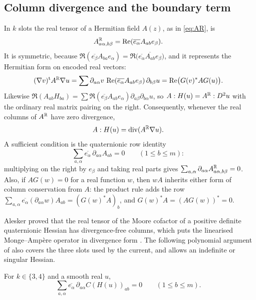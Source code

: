 \subsection{Column divergence and the boundary term}\label{ssec:divergence}
In $k$ slots the real tensor of a Hermitian field $A(z)$, as in \eqref{eq:AR}, is
\begin{equation}\label{eq:ARk}
A^{\mathbb{R}}_{a\alpha,b\beta}=\operatorname{Re}(\overline{e_\alpha}A_{ab}e_\beta) .
\end{equation}
It is symmetric, because $\Re(\overline{e_\beta}A_{ba}e_\alpha)=\Re\bigl(\overline{\overline{e_\alpha}A_{ab}e_\beta}\bigr)$,
and it represents the Hermitian form on encoded real vectors:
\[
(\nabla v)^{\rm t}A^{\mathbb{R}}\nabla u=\sum\partial_{a\alpha}v\,\operatorname{Re}(\overline{e_\alpha}A_{ab}e_\beta)\,\partial_{b\beta}u
=\operatorname{Re}\bigl(G(v)^*AG(u)\bigr).
\]
Likewise $\Re(A_{ab}H_{ba})=\sum\Re(\overline{e_\beta}A_{ab}e_\alpha)\partial_{a\beta}\partial_{b\alpha}u$,
so $A:H(u)=A^{\mathbb{R}}:D^2u$ with the ordinary real matrix pairing on the right. Consequently,
whenever the real columns of $A^{\mathbb{R}}$ have zero divergence,
\begin{equation}\label{eq:divform}
A:H(u)=\operatorname{div}(A^{\mathbb{R}}\nabla u) .
\end{equation}
A sufficient condition is the quaternionic row identity
\begin{equation}\label{eq:rowid}
\sum_{a,\alpha}\overline{e_\alpha}\,\partial_{a\alpha}A_{ab}=0\qquad(1\le b\le m):
\end{equation}
multiplying on the right by $e_\beta$ and taking real parts gives
$\sum_{a,\alpha}\partial_{a\alpha}A^{\mathbb{R}}_{a\alpha,b\beta}=0$. Also, if $AG(w)=0$ for a real
function $w$, then $wA$ inherits either form of column conservation from $A$: the product rule
adds the row $\sum_{a,\alpha}\overline{e_\alpha}(\partial_{a\alpha}w)A_{ab}=(G(w)^*A)_b$, and
$G(w)^*A=(AG(w))^*=0$.

Alesker proved that the real tensor of the Moore cofactor of a positive definite quaternionic
Hessian has divergence-free columns, which puts the linearised Monge--Amp\`ere operator in
divergence form \cite[Lemma 4.6]{Ale13}. The following polynomial argument of \cite{OAI26} also
covers the three slots used by the current, and allows an indefinite or singular Hessian.

\begin{lemma}\label{lem:cofdiv}
For $k\in\{3,4\}$ and a smooth real $u$,
\begin{equation}\label{eq:cofdiv}
\sum_{a,\alpha}\overline{e_\alpha}\,\partial_{a\alpha}C(H(u))_{ab}=0\qquad(1\le b\le m).
\end{equation}
\end{lemma}

